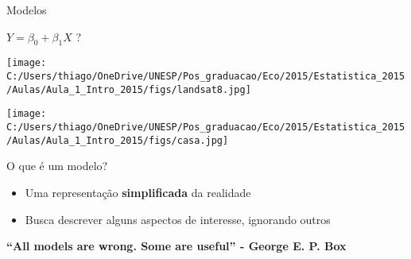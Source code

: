 \documentclass{beamer}\usepackage[]{graphicx}\usepackage[]{color}
\begin{document}
\begin{frame}{Modelos}

\begin{huge}
\centering

$Y = \beta _0 + \beta _1 X$ ?

\end{huge}
\end{frame}

 
\begin{frame}

\texttt{[image: C:/Users/thiago/OneDrive/UNESP/Pos\_graduacao/Eco/2015/Estatistica\_2015/Aulas/Aula\_1\_Intro\_2015/figs/landsat8.jpg]}

\end{frame}


\begin{frame}
\centering
\texttt{[image: C:/Users/thiago/OneDrive/UNESP/Pos\_graduacao/Eco/2015/Estatistica\_2015/Aulas/Aula\_1\_Intro\_2015/figs/casa.jpg]}
\end{frame}



\begin{frame}{O que é um modelo?}
  \begin{itemize}
		\item
			Uma representação \textbf{simplificada} da realidade
      
      \vfill
		\item
			Busca descrever alguns aspectos de interesse, ignorando outros
	\end{itemize}


\vfill

\alert{\textbf{``All models are wrong. Some are useful'' - George E. P. Box}}

\end{frame}
\end{document}
